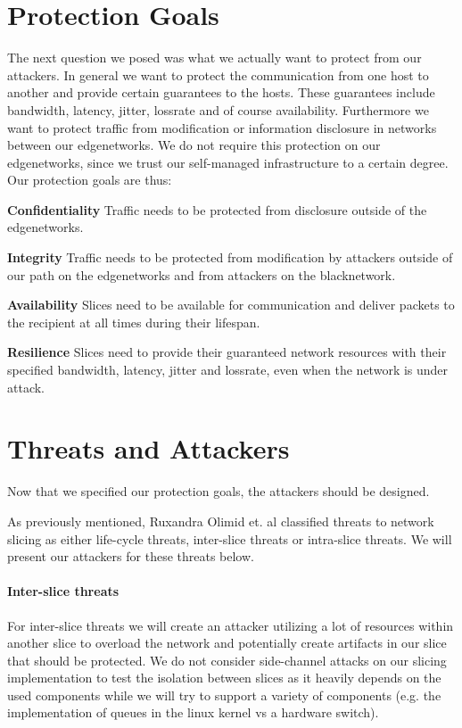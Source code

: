 \section{Protection Goals}
\label{protection_goals}
The next question we posed was what we actually want to protect from our attackers. In general we want to protect the communication from one host to another and provide certain guarantees to the hosts. These guarantees include \gls{bandwidth}, \gls{latency}, \gls{jitter}, \gls{lossrate} and of course availability. Furthermore we want to protect traffic from modification or information disclosure in networks between our \gls{edgenetwork}s. We do not require this protection on our \gls{edgenetwork}s, since we trust our self-managed infrastructure to a certain degree. Our protection goals are thus:
\begin{description}[style=multiline, labelwidth=0.7cm]
    \item[\namedlabel{P1}{P1}] \textbf{Confidentiality} Traffic needs to be protected from disclosure outside of the \gls{edgenetwork}s.
    \item[\namedlabel{P2}{P2}] \textbf{Integrity} Traffic needs to be protected from modification by attackers outside of our path on the \gls{edgenetwork}s and from attackers on the \gls{blacknetwork}.
    \item[\namedlabel{P3}{P3}] \textbf{Availability} Slices need to be available for communication and deliver packets to the recipient at all times during their lifespan.
    \item[\namedlabel{P4}{P4}] \textbf{Resilience} Slices need to provide their guaranteed network resources with their specified \gls{bandwidth}, \gls{latency}, \gls{jitter} and \gls{lossrate}, even when the network is under attack.
\end{description}


\section{Threats and Attackers}
\label{adversaries}
Now that we specified our protection goals, the attackers should be designed.

As previously mentioned, Ruxandra Olimid et. al \cite{SE2} classified threats to network slicing as either life-cycle threats, inter-slice threats or intra-slice threats. We will present our attackers for these threats below.

\paragraph{Inter-slice threats} For inter-slice threats we will create an attacker utilizing a lot of resources within another slice to overload the network and potentially create artifacts in our slice that should be protected. We do not consider side-channel attacks on our slicing implementation to test the isolation between slices as it heavily depends on the used components while we will try to support a variety of components (e.g. the implementation of queues in the linux kernel vs a hardware switch).

